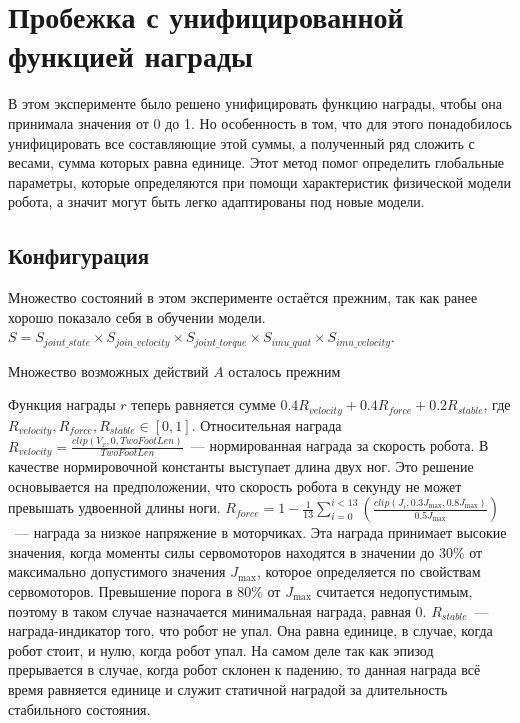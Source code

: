 \section{Пробежка с унифицированной функцией награды}\label{sec:ch5/sec5}
В этом эксперименте было решено унифицировать функцию награды, чтобы она принимала значения от 0 до 1. Но особенность в том, что для этого понадобилось унифицировать все составляющие этой суммы, а полученный ряд сложить с весами, сумма которых равна единице. Этот метод помог определить глобальные параметры, которые определяются при помощи характеристик физической модели робота, а значит могут быть легко адаптированы под новые модели.

\subsection{Конфигурация}\label{sec:ch5.1/sec5}
Множество состояний в этом эксперименте остаётся прежним, так как ранее хорошо показало себя в обучении модели.  $S = S_{joint\_state} \times S_{join\_velocity} \times S_{joint\_torque} \times S_{imu\_quat} \times S_{imu\_velocity}$.

Множество возможных действий $A$ осталось прежним

Функция награды $r$ теперь равняется сумме $0.4R_{velocity} + 0.4R_{force} + 0.2R_{stable}$, где $R_{velocity}, R_{force}, R_{stable} \in [0, 1]$. Относительная награда $R_{velocity} = \frac{clip(V_x, 0, TwoFootLen)}{TwoFootLen}$~--- нормированная награда за скорость робота. В качестве нормировочной константы выступает длина двух ног. Это решение основывается на предположении, что скорость робота в секунду не может превышать удвоенной длины ноги.  $R_{force} = 1 - \frac{1}{13}\sum\limits_{i=0}^{i < 13}(\frac{clip(J_i, 0.3J_{\max}, 0.8J_{\max})}{0.5J_{\max}})$~--- награда за низкое напряжение в моторчиках. Эта награда принимает высокие значения, когда моменты силы сервомоторов находятся в значении до $30\%$ от максимально допустимого значения $J_{\max}$, которое определяется по свойствам сервомоторов. Превышение порога в $80\%$ от $J_{\max}$ считается недопустимым, поэтому в таком случае назначается минимальная награда, равная $0$. $R_{stable}$~--- награда-индикатор того, что робот не упал. Она равна единице, в случае, когда робот стоит, и нулю, когда робот упал. На самом деле так как эпизод прерывается в случае, когда робот склонен к падению, то данная награда всё время равняется единице и служит статичной наградой за длительность стабильного состояния.

